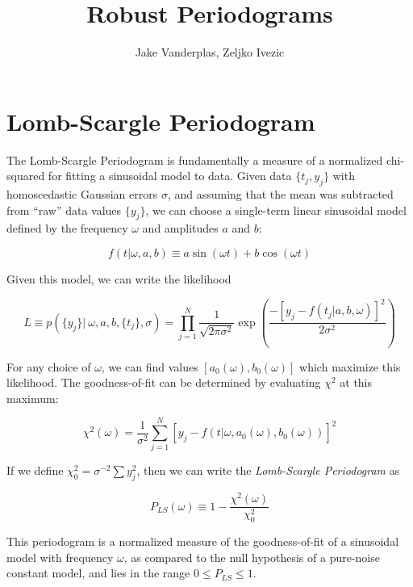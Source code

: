 \documentclass[12pt,pdftex]{article}
\title{Robust Periodograms}
\author{Jake Vanderplas, Zeljko Ivezic}
\begin{document}
\maketitle

\section{Lomb-Scargle Periodogram}
The Lomb-Scargle Periodogram is fundamentally a measure of a normalized chi-squared for fitting a sinusoidal model to data. Given data $\{t_j, y_j\}$ with homoscedastic Gaussian errors $\sigma$, and assuming that the mean was subtracted from ``raw'' data
values $\{y_j\}$, we can choose a single-term linear sinusoidal model defined by the frequency $\omega$ and amplitudes $a$ and $b$:

\begin{equation}
  f(t|\omega, a, b) \equiv a\sin(\omega t) + b\cos(\omega t)
\end{equation}

Given this model, we can write the likelihood

\begin{equation}
\label{eq:dataL} 
 L \equiv p(\{y_j\} |~\omega, a, b, \{t_j\}, \sigma) =
  \prod_{j=1}^{N} \frac{1}{\sqrt{2\pi\sigma^2}} \exp\left(
  \frac{-[y_j - f(t_j|a, b, \omega)]^2}{2\sigma^2} \right)
\end{equation}

For any choice of $\omega$, we can find values $[a_0(\omega), b_0(\omega)]$ which maximize this likelihood. The goodness-of-fit can be determined by evaluating $\chi^2$ at this maximum:

\begin{equation}
  \chi^2(\omega) = \frac{1}{\sigma^2}\sum_{j=1}^N[y_j - f(t|\omega, a_0(\omega), b_0(\omega))]^2
\end{equation}

If we define $\chi_0^2 = \sigma^{-2}\sum y_j^2$, then we can write the {\it Lomb-Scargle Periodogram} as

\begin{equation}
\label{eq:PLS} 
  P_{LS}(\omega) \equiv 1 - \frac{\chi^2(\omega)}{\chi_0^2}
\end{equation}

This periodogram is a normalized measure of the goodness-of-fit of a sinusoidal model with frequency $\omega$, as compared to the null hypothesis of a pure-noise constant model, and lies in the range $0 \le P_{LS} \le 1$.
\end{document}
